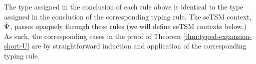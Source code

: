 The type assigned in the conclusion of each rule above is identical to the type assigned in the conclusion of the corresponding typing rule. The seTSM context, $\hat{\Psi}$, passes opaquely through these rules (we will define seTSM contexts below.) As such, the corresponding cases in the proof of Theorem \ref{thm:typed-expansion-short-U} are by straightforward induction and application of the corresponding typing rule. %

